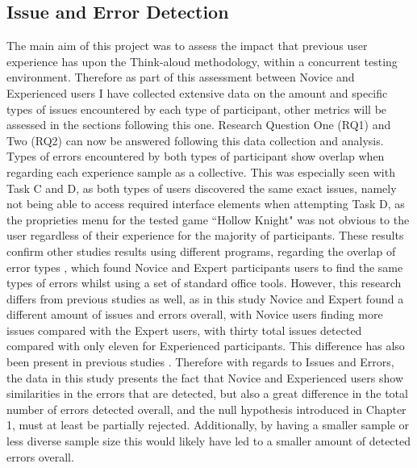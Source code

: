 \subsection{Issue and Error Detection}
The main aim of this project was to assess the impact that previous user experience has upon the Think-aloud methodology, within a concurrent testing environment. Therefore as part of this assessment between Novice and Experienced users I have collected extensive data on the amount and specific types of issues encountered by each type of participant, other metrics will be assessed in the sections following this one. Research Question One (RQ1) and Two (RQ2) can now be answered following this data collection and analysis. Types of errors encountered by both types of participant show overlap when regarding each experience sample as a collective. This was especially seen with Task C and D, as both types of users discovered the same exact issues, namely not being able to access required interface elements when attempting Task D, as the proprieties menu for the tested game ``Hollow Knight" was not obvious to the user regardless of their experience for the majority of participants. These results confirm other studies results using different programs, regarding the overlap of error types \citep{prumper1991errors}, which found Novice and Expert participants users to find the same types of errors whilst using a set of standard office tools. However, this research differs from previous studies as well, as in this study Novice and Expert found a different amount of issues and errors overall, with Novice users finding more issues compared with the Expert users, with thirty total issues detected compared with only eleven for Experienced participants. This difference has also been present in previous studies \citep{gerardo2007effectiveness}. Therefore with regards to Issues and Errors, the data in this study presents the fact that Novice and Experienced users show similarities in the errors that are detected, but also a great difference in the total number of errors detected overall, and the null hypothesis introduced in Chapter 1, must at least be partially rejected. Additionally, by having a smaller sample or less diverse sample size this would likely have led to a smaller amount of detected errors overall.

